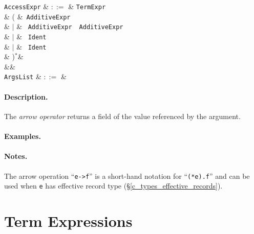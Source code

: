 \begin{syntax}
  \verb+AccessExpr+ & $::=$ & \verb+TermExpr+\\
   &  \big( &\token{[}\ \verb+AdditiveExpr+\ \token{]}\\
   & $|$ & \token{[}\ \verb+AdditiveExpr+\ \ \verb+AdditiveExpr+\ \token{]}\\
   & $|$ & \ \verb+Ident+\ \\
   & $|$ & \token{->}\ \verb+Ident+\ \\
   & \big)$^*$&\\
&&\\
\verb+ArgsList+ & $::=$ & \\
\end{syntax}

\paragraph{Description.}

The {\em arrow operator} returns a field of the value referenced by the argument.

\paragraph{Examples.}

\paragraph{Notes.} The arrow operation ``\lstinline{e->f}'' is a short-hand notation for ``\lstinline{(*e).f}'' and can be used when \lstinline{e} has effective record type (\S\ref{c_types_effective_records}).


\section{Term Expressions}
\label{c_expr_term}

